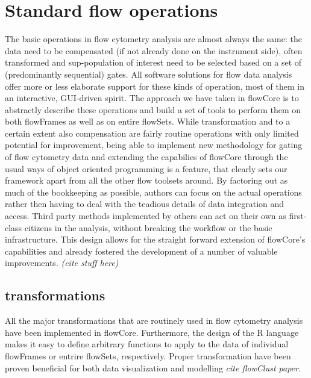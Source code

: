 \documentclass[12pt]{article}
\begin{document}
\section{Standard flow operations}
The basic operations in flow cytometry analysis are almost always the
same: the data need to be compensated (if not already done on the
instrument side), often transformed and sup-population of interest
need to be selected based on a set of (predominantly sequential)
gates. All software solutions for flow data analysis offer more or
less elaborate support for these kinds of operation, most of them in
an interactive, GUI-driven spirit. The approach we have taken in
flowCore is to abstractly describe these operations and build a set of
tools to perform them on both flowFrames as well as on entire
flowSets. While transformation and to a certain extent also
compensation are fairly routine operations with only limited potential
for improvement, being able to implement new methodology for gating of
flow cytometry data and extending the capabilies of flowCore through
the usual ways of object oriented programming is a feature, that
clearly sets our framework apart from all the other flow toolsets
around. By factoring out as much of the bookkeeping as possible,
authors can focus on the actual operations rather then having to deal
with the teadious details of data integration and access. Third party
methods implemented by others can act on their own as first-class
citizens in the analysis, without breaking the workflow or the basic
infrastructure. This design allows for the straight forward extension
of flowCore's capabilities and already fostered the development of a
number of valuable improvements. \textit{(cite stuff here)}




\subsection{transformations}
All the major transformations that are routinely used in flow
cytometry analysis have been implemented in flowCore. Furthermore, the
design of the R language makes it easy to define arbitrary functions
to apply to the data of individual flowFrames or entrire flowSets,
respectively. Proper transformation have been proven beneficial for
both data visualization and modelling \textit{cite flowClust paper}. 
\end{document}
